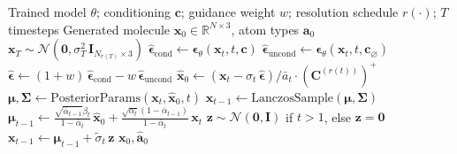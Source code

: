 \documentclass[12pt,a4paper]{article}
\providecommand{\R}{}
\renewcommand{\R}{\mathbb{R}}
\newcommand{\bx}{\bm{x}}
\newcommand{\bz}{\bm{z}}
\newcommand{\bep}{\bm{\epsilon}}
\newcommand{\bmu}{\bm{\mu}}
\newcommand{\bSigma}{\bm{\Sigma}}
\newcommand{\cN}{\mathcal{N}}
\begin{document}
\begin{algorithm}[H]
\caption{MolSSD Sampling (Reverse Process)}\label{alg:sampling}
\begin{algorithmic}[1]
\Require Trained model $\theta$; conditioning $\bm{c}$; guidance weight $w$; resolution schedule $r(\cdot)$; $T$ timesteps
\Ensure Generated molecule $\bx_0 \in \R^{N \times 3}$, atom types $\bm{a}_0$
\State $\bx_T \sim \cN(\bm{0}, \sigma_T^2\, \bm{I}_{N_{r(T)} \times 3})$ 
    \State $\hat{\bep}_{\text{cond}} \gets \bep_\theta(\bx_t, t, \bm{c})$ 
    \State $\hat{\bep}_{\text{uncond}} \gets \bep_\theta(\bx_t, t, \bm{c}_\varnothing)$ 
    \State $\hat{\bep} \gets (1 + w)\, \hat{\bep}_{\text{cond}} - w\, \hat{\bep}_{\text{uncond}}$ 
    \State $\hat{\bx}_0 \gets (\bx_t - \sigma_t\, \hat{\bep}) / \bar{a}_t \cdot (\bm{C}^{(r(t))})^+$ 
     
        \State {}
        \State $\bmu, \bSigma \gets \text{PosteriorParams}(\bx_t, \hat{\bx}_0, t)$ 
        \State $\bx_{t-1} \gets \text{LanczosSample}(\bmu, \bSigma)$ 
    \Else {}
        \State $\bmu_{t-1} \gets \frac{\sqrt{\bar{\alpha}_{t-1}} \beta_t}{1 - \bar{\alpha}_t}\, \hat{\bx}_0 + \frac{\sqrt{\alpha_t}(1 - \bar{\alpha}_{t-1})}{1 - \bar{\alpha}_t}\, \bx_t$
        \State $\bz \sim \cN(\bm{0}, \bm{I})$ if $t > 1$, else $\bz = \bm{0}$
        \State $\bx_{t-1} \gets \bmu_{t-1} + \tilde{\sigma}_t\, \bz$
    \EndIf
\EndFor
\State \Return $\bx_0, \hat{\bm{a}}_0$
\end{algorithmic}
\end{algorithm}
\end{document}

